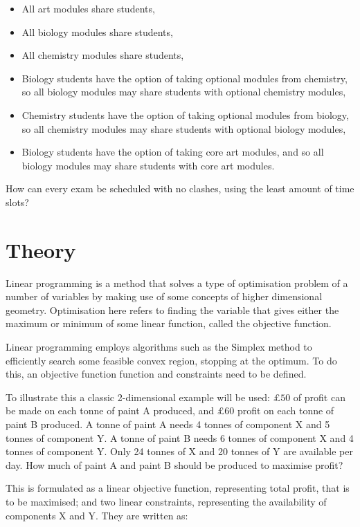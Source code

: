 \begin{itemize}
  \item All art modules share students,
  \item All biology modules share students,
  \item All chemistry modules share students,
  \item Biology students have the option of taking optional modules from
  chemistry, so all biology modules may share students with optional chemistry
  modules,
  \item Chemistry students have the option of taking optional modules from
  biology, so all chemistry modules may share students with optional biology
  modules,
  \item Biology students have the option of taking core art modules, and so all
  biology modules may share students with core art modules.
\end{itemize}

How can every exam be scheduled with no clashes, using the least amount of
time slots?

\section{Theory}\label{sec:linear_programming_theory}

Linear programming is a method that solves a type of optimisation problem of a
number of variables by making use of some concepts of higher dimensional
geometry\autocite{conforti2014integer}.
Optimisation here refers to finding the variable that gives either the maximum
or minimum of some linear function, called the objective function.

Linear programming employs algorithms such as the Simplex
method
to efficiently search some feasible convex region, stopping at the optimum. To
do this, an objective function function and constraints need to be defined.

To illustrate this a classic 2-dimensional example will be used:
\(\pounds 50\) of profit can be made on each
tonne of paint A produced, and \(\pounds 60\) profit on each tonne of paint B
produced. A tonne of paint A needs 4 tonnes of component X and 5 tonnes of
component Y. A tonne of paint B needs 6 tonnes of component X and 4 tonnes of
component Y. Only 24 tonnes of X and 20 tonnes of Y are available per day. How
much of paint A and paint B should be produced to maximise profit?

This is formulated as a linear objective function, representing total profit,
that is to be maximised; and two linear constraints, representing the
availability of components X and Y. They are written as:

